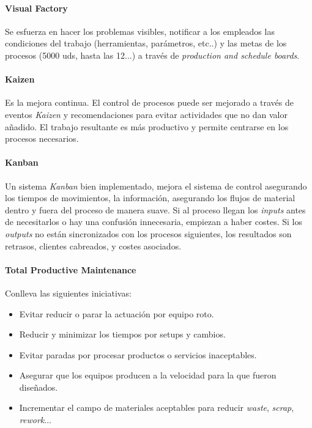 \documentclass[]{article}
\begin{document}
\paragraph{Visual Factory}

Se esfuerza en hacer los problemas visibles, notificar a los empleados las condiciones del trabajo (herramientas, parámetros, etc..) y las metas de los procesos (5000 uds, hasta las 12...) a través de \textit{production and schedule boards}.

\paragraph{Kaizen}
Es la mejora continua. El control de procesos puede ser mejorado a través de eventos \textit{Kaizen} y recomendaciones para evitar actividades que no dan valor añadido. El trabajo resultante es más productivo y permite centrarse en los procesos necesarios.

\paragraph{Kanban}
Un sistema \textit{Kanban} bien implementado, mejora el sistema de control asegurando los tiempos de movimientos, la información, asegurando los flujos de material dentro y fuera del proceso de manera suave. Si al proceso llegan los \textit{inputs} antes de necesitarlos o hay una confusión innecesaria, empiezan a haber costes. Si los \textit{outputs} no están sincronizados con los procesos siguientes, los resultados son retrasos, clientes cabreados, y costes asociados.

\paragraph{Total Productive Maintenance}

Conlleva las siguientes iniciativas: \begin{itemize}
	\item Evitar reducir o parar la actuación por equipo roto.
	\item Reducir y minimizar los tiempos por setups y cambios.
	\item Evitar paradas por procesar productos o servicios inaceptables.
	\item Asegurar que los equipos producen a la velocidad para la que fueron diseñados.
	\item Incrementar el campo de materiales aceptables para reducir \textit{waste}, \textit{scrap}, \textit{rework}...
\end{itemize}
\end{document}
